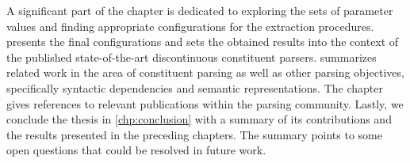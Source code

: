 \documentclass[../document.tex]{subfiles}
\begin{document}
    A significant part of the chapter is dedicated to exploring the sets of parameter values and finding appropriate configurations for the extraction procedures.
     presents the final configurations and sets the obtained results into the context of the published state-of-the-art discontinuous constituent parsers.
     summarizes related work in the area of constituent parsing as well as other parsing objectives, specifically syntactic dependencies and semantic representations.
    The chapter gives references to relevant publications within the parsing community.
    Lastly, we conclude the thesis in \cref{chp:conclusion} with a summary of its contributions and the results presented in the preceding chapters.
    The summary points to some open questions that could be resolved in future work.

    \ifSubfilesClassLoaded{%
        \printindex
    }{}
\end{document}
